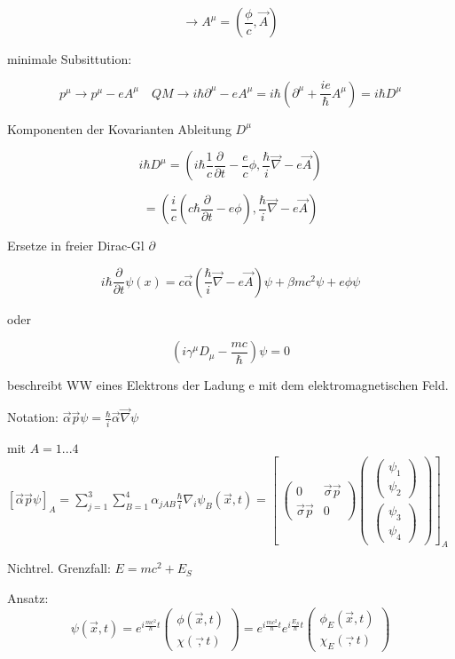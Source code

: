 \[\rightarrow A^\mu = (\frac{\phi}{c},\vec A)\]

minimale Subsittution:

\[p^\mu\rightarrow p^\mu-eA^\mu \quad QM\rightarrow i\hbar\partial^\mu-eA^\mu = i\hbar(\partial^\mu+\frac{ie}{\hbar}A^\mu)=i\hbar D^\mu\]

Komponenten der Kovarianten Ableitung \(D^\mu\)

\[i\hbar D^\mu = (i\hbar \frac{1}{c} \frac{\partial}{\partial t} - \frac{e}{c}\phi,\frac{\hbar}{i}\vec\nabla-e\vec A)\]

\[=(\frac{i}{c}(c\hbar\frac{\partial}{\partial t}-e\phi),\frac{\hbar}{i}\vec\nabla-e\vec A) \]

Ersetze in freier Dirac-Gl \(\partial \)


\[\boxed{i\hbar \frac{\partial}{\partial t}\psi(x) = c\vec \alpha(\frac{\hbar}{i}\vec\nabla-e\vec A)\psi+\beta m c^2\psi+e\phi\psi}\]

oder

\[\boxed{(i\gamma^\mu D_\mu - \frac{mc}{\hbar})\psi = 0}\]

beschreibt WW eines Elektrons der Ladung e mit dem elektromagnetischen Feld.

Notation: \(\vec \alpha\vec p\psi = \frac{\hbar}{i}\vec\alpha\vec\nabla\psi\)

mit \(A=1...4\) \([\vec\alpha\vec p\psi]_A=\sum_{j=1}^3\sum_{B=1}^4\alpha_{jAB}\frac{\hbar}{i}\nabla_i\psi_B(\vec x,t) = \left[\ \begin{pmatrix} 0&\vec\sigma\vec p\\ \vec\sigma\vec p&0\end{pmatrix}\begin{pmatrix} \begin{pmatrix} \psi_1\\\psi_2\end{pmatrix} \\ \begin{pmatrix} \psi_3\\\psi_4\end{pmatrix}  \end{pmatrix} \right]_A\)


Nichtrel. Grenzfall: \(E=mc^2+E_S\)

Ansatz: 
\[\psi(\vec x,t) = e^{i\frac{mc^2}{\hbar}t}\begin{pmatrix}\phi(\vec x,t)\\\chi(\vec,t)\end{pmatrix} =  e^{i\frac{mc^2}{\hbar}t}  e^{i\frac{E_S}{\hbar}t} \begin{pmatrix}\phi_E(\vec x,t)\\\chi_E(\vec,t)\end{pmatrix}\]

